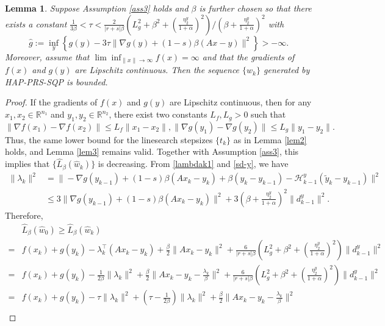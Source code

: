 \documentclass[pdflatex,sn-mathphys-num]{sn-jnl}%
\theoremstyle{thmstyleone}%
\newtheorem{lemma}{Lemma}
\theoremstyle{thmstyletwo}%
\theoremstyle{thmstylethree}%
\begin{document}
\begin{lemma}
	Suppose Assumption \ref{ass3} holds and $\beta$ is further chosen so that there exists a constant $\frac{1}{3\beta}<\tau<\frac{2}{|r+s|\beta}\left(L_g^2+\beta ^2+(\frac{\eta_2^y}{1+\alpha})^2\right)/ (\beta+\frac{\eta_2^y}{1+\alpha})^2$ with
	\begin{equation}\label{lem:boundseq}
		\hat{g}:=\inf_y \left\{g(y)-3\tau \|\nabla g (y)+(1-s)\beta(A x-y)\|^2\right\}>-\infty.
	\end{equation}
		Moreover, assume that $\lim\inf_{\|x\|\to\infty}f(x)=\infty$ and that the gradients of $f(x)$ and $g(y)$ are Lipschitz continuous. Then the sequence $\{w_k\}$ generated by HAP-PRS-SQP is bounded.
\end{lemma}
\begin{proof}
	If the gradients of $f(x)$ and $g(y)$ are Lipschitz continuous, then for any $x_1,x_2\in \mathbb{R}^{n_1}$ and $y_1,y_2\in \mathbb{R}^{n_2}$, there exist two constants $L_f,L_g>0$ such that
	\[
		\|\nabla f(x_1)-\nabla f(x_2)\|\leq L_f\|x_1-x_2\|,
		\|\nabla g(y_1)-\nabla g(y_2)\|\leq L_g\|y_1-y_2\|.
	\]
	Thus, the same lower bound for the linesearch stepsizes $\{t_k\}$ as in Lemma \ref{lem2} holds, and Lemma \ref{lem3} remains valid. Together with Assumption \ref{ass3}, this implies that $\{\hat{L}_{\beta}(\hat{w}_k)\}$ is decreasing. From \eqref{lambdak1} and \eqref{sd-y}, we have
	\[\begin{aligned}
		\|\lambda_k\|^2&=\|-\nabla g (y_{k-1})+(1-s)\beta(A x_{k}-y_{k})+\beta(y_{k}-y_{k-1})-\mathcal{H}_{k-1}^y (\tilde{y}_{k}-y_{k-1})\|^2\\
		&\leq 3\|\nabla g (y_{k-1})+(1-s)\beta(A x_{k}-y_{k})\|^2+3(\beta+\frac{\eta_2^y}{1+\alpha})^2\|d_{k-1}^{y}\|^2.
	\end{aligned}\]
	Therefore,
	\[\begin{aligned}
		&\hat{L}_{\beta}(\hat{w}_0)\geq \hat{L}_{\beta}(\hat{w}_k)\\
		=&f(x_k)+g(y_k)-\lambda_k^{\top}(Ax_k-y_k)+\frac{\beta}{2}\|Ax_k-y_k\|^2+\frac{6}{|r+s|\beta}\left(L_g^2+\beta ^2+(\frac{\eta_2^y}{1+\alpha})^2\right)\|d^y_{k-1}\|^2\\
		=&f(x_k)+g(y_k)-\frac{1}{2\beta}\|\lambda_k\|^2+\frac{\beta}{2}\|Ax_k-y_k-\frac{\lambda_k}{\beta}\|^2+\frac{6}{|r+s|\beta}\left(L_g^2+\beta ^2+(\frac{\eta_2^y}{1+\alpha})^2\right)\|d^y_{k-1}\|^2\\
		=&f(x_k)+g(y_k)-\tau\|\lambda_k\|^2+(\tau-\frac{1}{2\beta})\|\lambda_k\|^2+\frac{\beta}{2}\|Ax_k-y_k-\frac{\lambda_k}{\beta}\|^2\\

\end{aligned}\]
\end{proof}
\end{document}
